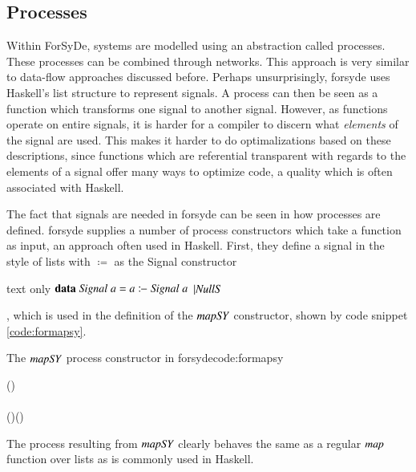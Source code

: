 \subsection{Processes}
Within ForSyDe, systems are modelled using an abstraction called processes. 
These processes can be combined through networks. 
This approach is very similar to data-flow approaches discussed before.
Perhaps unsurprisingly, \gls{forsyde} uses Haskell's list structure to represent signals.
A process can then be seen as a function which transforms one signal to another signal.
However, as functions operate on entire signals, it is harder for a compiler to discern what \textit{elements} of the signal are used.
This makes it harder to do optimalizations based on these descriptions, since functions which are referential transparent with regards to the elements of a signal offer many ways to optimize code, a quality which is often associated with Haskell.

The fact that signals are needed in \gls{forsyde} can be seen in how processes are defined.
\gls{forsyde} supplies a number of process constructors which take a function as input, an approach often used in Haskell. 
First, they define a signal in the style of lists with \ensuremath{\coloneq} as the Signal constructor
\begin{changemargin}{1cm}{0cm}
\begin{expansionno}{text only}
\ensuremath{\mathbf{data}\;\Conid{Signal}\;\Varid{a}\mathrel{=}\Varid{a}\coloneq\Conid{Signal}\;\Varid{a}}
\ensuremath{| \Conid{NullS}}
\end{expansionno}
\end{changemargin}
, which is used in the definition of the \ensuremath{\Varid{mapSY}} constructor, shown by code snippet \ref{code:formapsy}.

\begin{texexptitled}{The \ensuremath{\Varid{mapSY}} process constructor in \gls{forsyde}}{code:formapsy}
\begin{hscode}\SaveRestoreHook
{}%
%
%
\>[B]{}\mathbin{::}(\to {})\to {}\;\to {}\;\<[E]%
\\
\>[B]{}\;\anonymous \;\<[17]%
\>[17]{}\mathrel{=}\<[E]%
\\
\>[B]{}\;\;(\coloneq{})\mathrel{=}\;\coloneq(\;\;){}\<[E]%
\ColumnHook
\end{hscode}\resethooks
\end{texexptitled}
The process resulting from \ensuremath{\Varid{mapSY}} clearly behaves the same as a regular \ensuremath{\Varid{map}} function over lists as is commonly used in Haskell.

